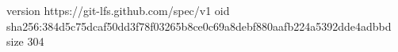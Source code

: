 version https://git-lfs.github.com/spec/v1
oid sha256:384d5c75dcaf50dd3f78f03265b8ce0c69a8debf880aafb224a5392dde4adbbd
size 304
